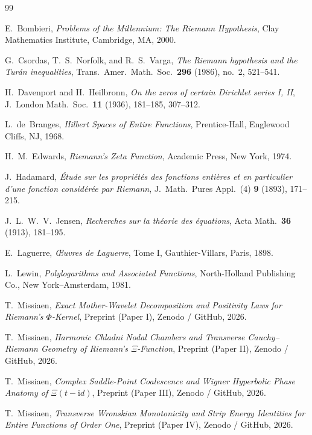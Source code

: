 \documentclass[11pt,reqno]{amsart}
\theoremstyle{definition}
\theoremstyle{remark}
\numberwithin{equation}{section}
\newcommand{\ii}{\mathrm{i}}
\begin{document}
\begin{thebibliography}{99}

E.~Bombieri, \emph{Problems of the Millennium: The Riemann Hypothesis}, Clay Mathematics Institute, Cambridge, MA, 2000.

G.~Csordas, T.~S.~Norfolk, and R.~S.~Varga, \emph{The Riemann hypothesis and the Tur\'{a}n inequalities}, Trans.\ Amer.\ Math.\ Soc.\ \textbf{296} (1986), no.~2, 521--541.

H.~Davenport and H.~Heilbronn, \emph{On the zeros of certain Dirichlet series I, II}, J.\ London Math.\ Soc.\ \textbf{11} (1936), 181--185, 307--312.

L.~de~Branges, \emph{Hilbert Spaces of Entire Functions}, Prentice-Hall, Englewood Cliffs, NJ, 1968.

H.~M.~Edwards, \emph{Riemann's Zeta Function}, Academic Press, New York, 1974.

J.~Hadamard, \emph{\'{E}tude sur les propri\'{e}t\'{e}s des fonctions enti\`{e}res et en particulier d'une fonction consid\'{e}r\'{e}e par Riemann}, J.\ Math.\ Pures Appl.\ (4) \textbf{9} (1893), 171--215.

J.~L.~W.~V.~Jensen, \emph{Recherches sur la th\'{e}orie des \'{e}quations}, Acta Math.\ \textbf{36} (1913), 181--195.

E.~Laguerre, \emph{\OE uvres de Laguerre}, Tome I, Gauthier-Villars, Paris, 1898.

L.~Lewin, \emph{Polylogarithms and Associated Functions}, North-Holland Publishing Co., New York--Amsterdam, 1981.

T.~Missiaen, \emph{Exact Mother-Wavelet Decomposition and Positivity Laws for Riemann's $\Phi$-Kernel}, Preprint (Paper I), Zenodo / GitHub, 2026.

T.~Missiaen, \emph{Harmonic Chladni Nodal Chambers and Transverse Cauchy--Riemann Geometry of Riemann's $\Xi$-Function}, Preprint (Paper II), Zenodo / GitHub, 2026.

T.~Missiaen, \emph{Complex Saddle-Point Coalescence and Wigner Hyperbolic Phase Anatomy of $\Xi(t-\ii d)$}, Preprint (Paper III), Zenodo / GitHub, 2026.

T.~Missiaen, \emph{Transverse Wronskian Monotonicity and Strip Energy Identities for Entire Functions of Order One}, Preprint (Paper IV), Zenodo / GitHub, 2026.


\end{thebibliography}
\end{document}
